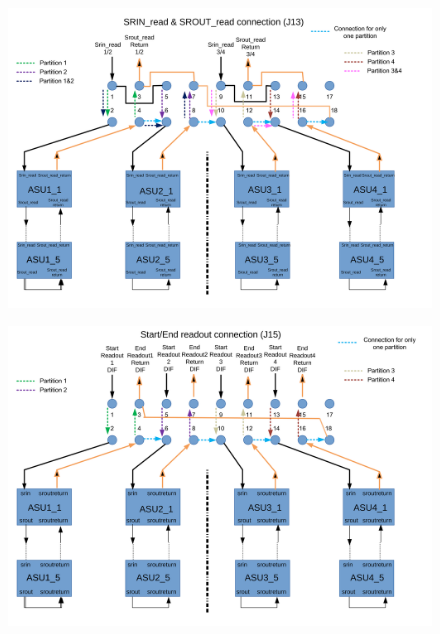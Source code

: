 \begin{figure}[H] \centering
\includegraphics[width=0.8\linewidth]{srinread_sroutread_version_prod}
  \caption{}\label{srinread_sroutread_version_prod}
\end{figure}
\begin{figure}[H] \centering
\includegraphics[width=0.8\linewidth]{start_end_readout_prod}
  \caption{}\label{start_end_readout_prod}
\end{figure}
